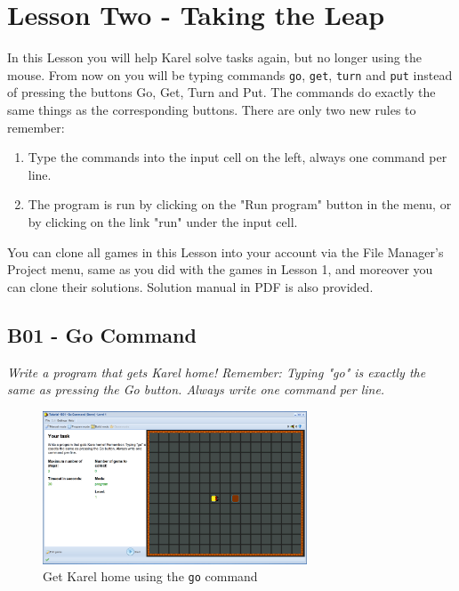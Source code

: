 \documentclass[article,A4,12pt]{llncs}
\begin{document}
\section{Lesson Two - Taking the Leap}

In this Lesson you will help Karel solve tasks again,
but no longer using the mouse. From now on you will be 
typing commands {\tt go}, {\tt get}, {\tt turn} and {\tt put} 
instead of pressing the buttons Go, Get, Turn and Put. The 
commands do exactly the same things as the corresponding buttons.  
There are only two new rules to remember:
\begin{enumerate} 
\item Type the commands into the input cell on the left, always one command per line.
\item The program is run by clicking on the "Run program" button in the menu, or by clicking 
      on the link "run" under the input cell.
\end{enumerate}
You can clone all games in this Lesson into your account via the File Manager's Project
menu, same as you did with the games in Lesson 1, and moreover you can clone their solutions. 
Solution manual in PDF is also provided. 

\subsection{B01 - Go Command}

{\em Write a program that gets Karel home! Remember: Typing "go" is exactly 
the same as pressing the Go button. Always write one command per line.}

\begin{figure}[!ht]
\begin{center}
\includegraphics[width=0.7\textwidth]{img/b01.png}
\end{center}
\vspace{-4mm}
\caption{Get Karel home using the {\tt go} command}
\label{fig:b01}
\vspace{-4mm}
\end{figure}
\noindent
\end{document}
